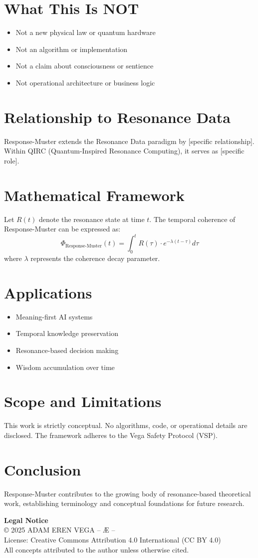 \documentclass[12pt,a4paper]{article}
\begin{document}
\section{What This Is NOT}
\begin{itemize}
\item Not a new physical law or quantum hardware
\item Not an algorithm or implementation
\item Not a claim about consciousness or sentience
\item Not operational architecture or business logic
\end{itemize}

\section{Relationship to Resonance Data}
Response-Muster extends the Resonance Data paradigm by [specific relationship].
Within QIRC (Quantum-Inspired Resonance Computing), it serves as [specific role].

\section{Mathematical Framework}
Let $R(t)$ denote the resonance state at time $t$. The temporal coherence of Response-Muster 
can be expressed as:
\[
\Phi_{\text{Response-Muster}}(t) = \int_0^t R(\tau) \cdot e^{-\lambda(t-\tau)} d\tau
\]
where $\lambda$ represents the coherence decay parameter.

\section{Applications}
\begin{itemize}
\item Meaning-first AI systems
\item Temporal knowledge preservation
\item Resonance-based decision making
\item Wisdom accumulation over time
\end{itemize}

\section{Scope and Limitations}
This work is strictly conceptual. No algorithms, code, or operational details are disclosed.
The framework adheres to the Vega Safety Protocol (VSP).

\section{Conclusion}
Response-Muster contributes to the growing body of resonance-based theoretical work, 
establishing terminology and conceptual foundations for future research.

\vspace{1cm}
\noindent\textbf{Legal Notice}\\
© 2025 ADAM EREN VEGA – Æ –\\
License: Creative Commons Attribution 4.0 International (CC BY 4.0)\\
All concepts attributed to the author unless otherwise cited.
\end{document}
